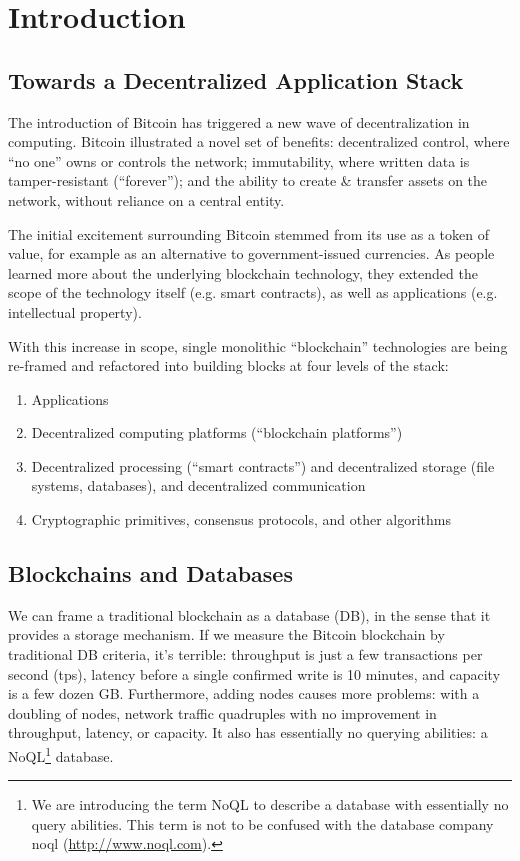 \section{Introduction}\label{sec:intro}

\subsection{Towards a Decentralized Application Stack}

The introduction of Bitcoin \cite{nakamoto2009bitcoin} has triggered a new wave of decentralization in computing. 
Bitcoin illustrated a novel set of benefits: decentralized control, where ``no one'' owns or controls the network; immutability,
where written data is tamper-resistant (``forever''); and the ability to create \& transfer assets on the network, without reliance on a central entity.

The initial excitement surrounding Bitcoin stemmed from its use as a token of value, for example as an alternative to government-issued currencies.
As people learned more about the underlying blockchain technology, they extended the scope of the technology itself (e.g. smart contracts), as well as applications (e.g. intellectual property).

With this increase in scope, single monolithic ``blockchain'' technologies are being re-framed and refactored into building blocks at four levels of the stack:
\begin{enumerate}
 \item Applications
 \item Decentralized computing platforms (``blockchain platforms'')
 \item Decentralized processing (``smart contracts'') and decentralized storage (file systems, databases), and decentralized communication
 \item Cryptographic primitives, consensus protocols, and other algorithms
\end{enumerate}

\subsection{Blockchains and Databases}
We can frame a traditional blockchain as a database (DB), in the sense that it provides a storage mechanism.
If we measure the Bitcoin blockchain by traditional DB criteria, it’s terrible: throughput is just a few transactions per second (tps), latency before a single confirmed write is 10 minutes, and capacity is a few dozen GB.
Furthermore, adding nodes causes more problems: with a doubling of nodes, network traffic quadruples with no improvement in throughput, latency, or capacity.
It also has essentially no querying abilities: a NoQL\footnote{We are introducing the term NoQL to describe a database with essentially no query abilities. This term is not to be confused with the database company noql (\url{http://www.noql.com}).} database.

